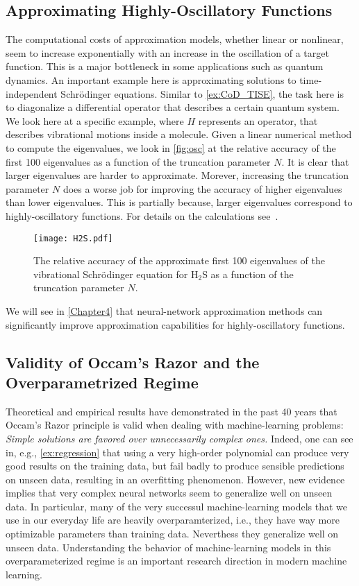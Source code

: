 \subsection{Approximating Highly-Oscillatory Functions}
The computational costs of approximation models, whether linear or nonlinear,
seem to increase exponentially with an increase in the oscillation of a target
function. This is a major bottleneck in some applications such as quantum
dynamics. An important example here is approximating solutions to
time-independent Schrödinger equations. Similar to \autoref{ex:CoD_TISE}, the
task here is to diagonalize a differential operator that describes a certain
quantum system. We look here at a specific example, where $H$ represents an
operator, that describes vibrational motions inside a molecule. Given a linear
numerical method to compute the eigenvalues, we look in \autoref{fig:osc} at the
relative accuracy of the
first 100 eigenvalues as a function of the truncation parameter $N$. It is clear
that larger eigenvalues are harder to approximate. Morever, increasing the
truncation parameter $N$ does a worse job for improving the accuracy of higher
eigenvalues than lower eigenvalues. This is partially because, larger
eigenvalues correspond to highly-oscillatory functions. For details on the
calculations see~\cite{Saleh:arXiv2308}.

\begin{figure}[htbp]
    \centering
    \texttt{[image: H2S.pdf]}
    \caption{The relative accuracy of the approximate first 100 eigenvalues of the vibrational Schrödinger equation for H$_2$S as a function of the truncation parameter $N$.}
    \label{fig:osc}
\end{figure}   
We will see in \autoref{Chapter4} that neural-network approximation methods can
significantly improve approximation capabilities for highly-oscillatory functions.
\subsection{Validity of Occam's Razor and the Overparametrized Regime}
Theoretical and empirical results have demonstrated in the past 40 years that
Occam's Razor principle is valid when dealing with machine-learning problems:
\emph{Simple solutions are favored over unnecessarily complex ones.} Indeed,
one can see in, e.g., \autoref{ex:regression} that using a very high-order
polynomial can produce very good results on the training data, but fail badly to
produce sensible predictions on unseen data, resulting in an overfitting
phenomenon. However, new evidence implies that very complex neural networks seem
to generalize well on unseen data. In particular, many of the very successul
machine-learning models that we use in our everyday life are heavily
overparamterized, i.e., they have way more optimizable parameters than training
data. Neverthess they generalize well on unseen data. Understanding the
behavior of machine-learning models in this overparameterized regime is an
important research direction in modern machine learning.

